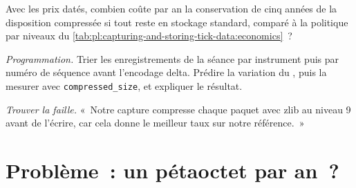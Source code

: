 \begin{exercise}[$\star\star$]\label{exo:pl:capturing-and-storing-tick-data:6}
Avec les prix datés, combien coûte par an la conservation de cinq années de la disposition compressée si tout reste en
stockage standard, comparé à la politique par niveaux du \cref{tab:pl:capturing-and-storing-tick-data:economics}~?
\end{exercise}

\begin{exercise}[$\star\star\star$]\label{exo:pl:capturing-and-storing-tick-data:7}
\emph{Programmation.} Trier les enregistrements de la séance par instrument puis par numéro de séquence avant l'encodage delta. Prédire la variation
du , puis la mesurer avec \texttt{compressed\_size}, et expliquer le résultat.
\end{exercise}

\begin{exercise}[$\star\star\star$]\label{exo:pl:capturing-and-storing-tick-data:8}
\emph{Trouver la faille.} «~Notre capture compresse chaque paquet avec zlib au niveau 9 avant de l'écrire, car cela donne le meilleur
taux sur notre référence.~»
\end{exercise}

\section{Problème~: un pétaoctet par an~?}

